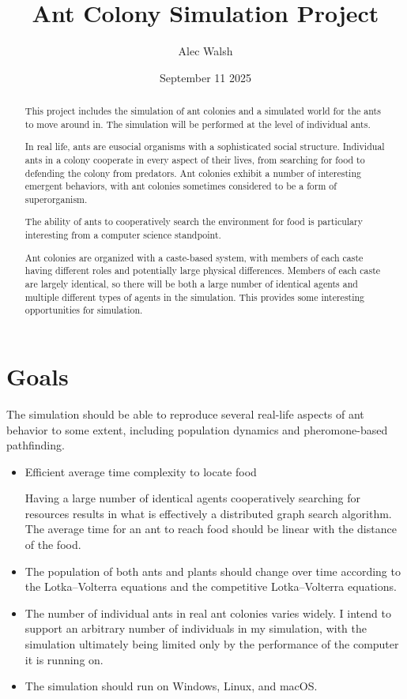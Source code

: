 \documentclass[journal]{IEEEtran}
\title{Ant Colony Simulation Project}
\author{Alec Walsh}
\date{September 11 2025}
\begin{document}
\maketitle

\begin{abstract}

This project includes the simulation of ant colonies and a simulated world for the ants to move around in.  The simulation will be performed at the level of individual ants.

In real life, ants are eusocial organisms with a sophisticated social structure.  Individual ants in a colony cooperate in every aspect of their lives, from searching for food to defending the colony from predators.  Ant colonies exhibit a number of interesting emergent behaviors, with ant colonies sometimes considered to be a form of superorganism.

The ability of ants to cooperatively search the environment for food is particulary interesting from a computer science standpoint.

Ant colonies are organized with a caste-based system, with members of each caste having different roles and potentially large physical differences.
Members of each caste are largely identical, so there will be both a large number of identical agents and multiple different types of agents in the simulation.  This provides some interesting opportunities for simulation.

\end{abstract}

\section{Goals}

The simulation should be able to reproduce several real-life aspects of ant behavior to some extent, including population dynamics and pheromone-based pathfinding.

\begin{itemize}

\item Efficient average time complexity to locate food

Having a large number of identical agents cooperatively searching for resources results in what is effectively a distributed graph search algorithm.  The average time for an ant to reach food should be linear with the distance of the food.

\item The population of both ants and plants should change over time according to the Lotka–Volterra equations and the competitive Lotka–Volterra equations.

\item The number of individual ants in real ant colonies varies widely.  I intend to support an arbitrary number of individuals in my simulation, with the simulation ultimately being limited only by the performance of the computer it is running on.

\item The simulation should run on Windows, Linux, and macOS.

\end{itemize}
\end{document}
